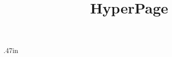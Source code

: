 % 

\usepackage{times}


    \oddsidemargin   .47in     %
    \evensidemargin 1.06in     %

\title{HyperPage} %

\pagestyle{plain}




